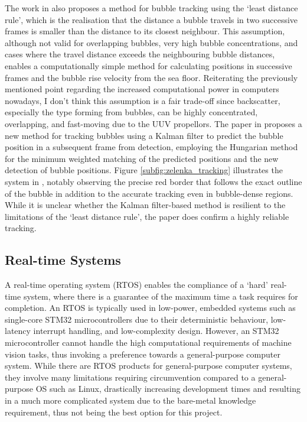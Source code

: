 The work in \cite{thomanekAutomatedGasBubble2010} also proposes a method for bubble tracking using the `least distance rule', which is the realisation that the distance a bubble travels in two successive frames is smaller than the distance to its closest neighbour. This assumption, although not valid for overlapping bubbles, very high bubble concentrations, and cases where the travel distance exceeds the neighbouring bubble distances, enables a computationally simple method for calculating positions in successive frames and the bubble rise velocity from the sea floor. Reiterating the previously mentioned point regarding the increased computational power in computers nowadays, I don't think this assumption is a fair trade-off since backscatter, especially the type forming from bubbles, can be highly concentrated, overlapping, and fast-moving due to the UUV propellors. The paper in \cite{zelenkaGasBubbleShape2014} proposes a new method for tracking bubbles using a Kalman filter \cite{kalmanNewApproachLinear1960} to predict the bubble position in a subsequent frame from detection, employing the Hungarian method \cite{kuhnHungarianMethodAssignment1955} for the minimum weighted matching of the predicted positions and the new detection of bubble positions. Figure \ref{subfig:zelenka_tracking} illustrates the system in \cite{zelenkaGasBubbleShape2014}, notably observing the precise red border that follows the exact outline of the bubble in addition to the accurate tracking even in bubble-dense regions. While it is unclear whether the Kalman filter-based method is resilient to the limitations of the `least distance rule', the paper \cite{zelenkaGasBubbleShape2014} does confirm a highly reliable tracking.

\subsection{Real-time Systems}
\label{bi_rt}
A real-time operating system (RTOS) enables the compliance of a `hard' real-time system, where there is a guarantee of the maximum time a task requires for completion. An RTOS is typically used in low-power, embedded systems such as single-core STM32 microcontrollers due to their deterministic behaviour, low-latency interrupt handling, and low-complexity design. However, an STM32 microcontroller cannot handle the high computational requirements of machine vision tasks, thus invoking a preference towards a general-purpose computer system. While there are RTOS products for general-purpose computer systems, they involve many limitations requiring circumvention compared to a general-purpose OS such as Linux, drastically increasing development times and resulting in a much more complicated system due to the bare-metal knowledge requirement, thus not being the best option for this project.

